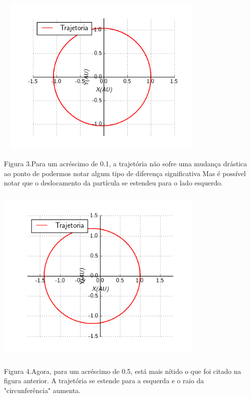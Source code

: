 \documentclass[a4paper]{article} %
\begin{document}
\begin{center}
	\includegraphics[width=4.14in,height=3.09in, keepaspectratio=false]{image2_15-50-59-794000.png}
	
	\scriptsize {Figura 3.Para um acréscimo de 0.1, a trajetória não sofre uma mudança drástica ao ponto de podermos notar algum tipo de diferença significativa Mas é possível notar que o deslocamento da partícula se estendeu para o lado esquerdo.}
	
\end{center}

\vspace{1.1cm}

\begin{center}
	\includegraphics[width=3.98in,height=3.44in, keepaspectratio=false]{image3_15-50-59-818000.png}

	
	\scriptsize {Figura 4.Agora, para um acréscimo de 0.5, está mais nítido o que foi citado na figura anterior. A trajetória se estende para a esquerda e o raio da "circunferência" aumenta.}
	
\end{center}
\end{document}
